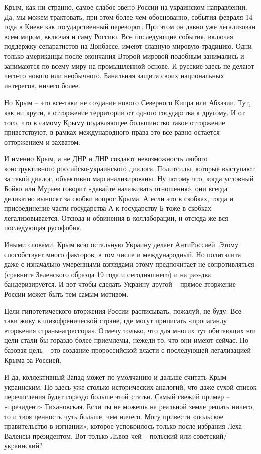 Крым, как ни странно, самое слабое звено России на украинском направлении. Да,
мы можем трактовать, при этом более чем обоснованно, события февраля 14 года в
Киеве как государственный переворот. При этом он давно уже легализован всем
миром, включая и саму Россию. Все последующие события, включая поддержку
сепаратистов на Донбассе, имеют славную мировую традицию. Одни только
американцы после окончания Второй мировой подобным занимались и занимаются по
всему миру на промышленной основе. И русские здесь не делают чего-то нового или
необычного. Банальная защита своих национальных интересов, ничего более.

Но Крым – это все-таки не создание нового Северного Кипра или Абхазии. Тут, как
ни крути, а отторжение территории от одного государства к другому. И от того,
что в самому Крыму подавляющее большинство такое отторжение приветствуют, в
рамках международного права это все равно остается отторжением и захватом.

И именно Крым, а не ДНР и ЛНР создают невозможность любого конструктивного
российско-украинского диалога. Политсилы, которые выступают за такой диалог,
объективно маргинализированы. Ну потому что, когда условный Бойко или Мураев
говорит «давайте налаживать отношения», они всегда деликатно выносят за скобки
вопрос Крыма. А если это в скобках, тогда и присоединение части государства А к
государству Б тоже в скобках легализовывается. Отсюда и обвинения в
коллаборации, и отсюда же вся последующая русофобия.

Иными словами, Крым всю остальную Украину делает АнтиРоссией. Этому
способствует много факторов, в том числе и международный. Но политэлита даже с
изначально умеренными взглядами этому предпочитает не сопротивляться (сравните
Зеленского образца 19 года и сегодняшнего) и на раз-два бандеризируется. И вот
чтобы сделать Украину другой – прямое вторжение России может быть тем самым
мотивом.

Цели гипотетического вторжения России расписывать, пожалуй, не буду. Все-таки
живу в шизофренической стране, где могут приписать «пропаганду вторжения
страны-агрессора». Отмечу только, что для многих тут обитающих эти цели стали
бы гораздо более приемлемы, нежели то, что они имеют сейчас. Но базовая цель –
это создание пророссийской власти с последующей легализацией Крыма за Россией.

И да, коллективный Запад может по умолчанию и дальше считать Крым украинским.
Но здесь уже столько исторических аналогий, что даже сухой список перечисления
будет гораздо больше этой статьи. Самый свежий пример – «президент»
Тихановская. Если ты не можешь на реальной земле решать ничего, то и твоя
ценность чуть больше, чем ничего. Могу привести «польское правительство в
изгнании», которое успокоилось только после избрания Леха Валенсы президентом.
Вот только Львов чей – польский или советский/украинский?

